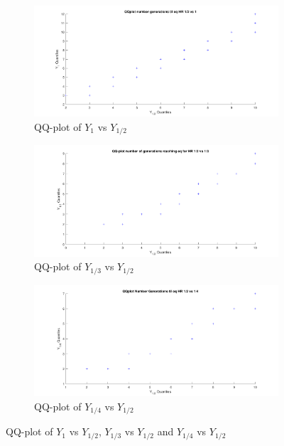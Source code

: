 \begin{figure}[H]
    \centering
    \begin{subfigure}{0.8\textwidth}
    \includegraphics[width=\textwidth]{QQplotATGEN3.pdf}
    \caption{QQ-plot of $Y_{1}$ vs $Y_{1/2}$}
        \label{fig:QQplotATGEN3}
    \end{subfigure}
    
    \begin{subfigure}{0.8\textwidth}
    \includegraphics[width=\textwidth]{QQplotATGEN1.pdf}
    \caption{QQ-plot of $Y_{1/3}$ vs $Y_{1/2}$}
        \label{fig:QQplotATGEN1}
    \end{subfigure}
    \begin{subfigure}{0.8\textwidth}
    \includegraphics[width=\textwidth]{QQplotATGEN2.pdf}
    \caption{QQ-plot of $Y_{1/4}$ vs $Y_{1/2}$}
        \label{fig:QQplotATGEN2}
    \end{subfigure}
    \caption{QQ-plot of $Y_{1}$ vs $Y_{1/2}$, $Y_{1/3}$ vs $Y_{1/2}$ and $Y_{1/4}$ vs $Y_{1/2}$}
    \label{fig:QQ-plot}
\end{figure}

